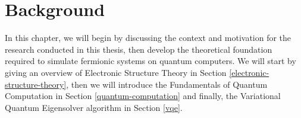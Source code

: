 \chapter{Background}%
\label{background}

In this chapter, we will begin by discussing the context and motivation for the research conducted in this thesis, then develop the theoretical foundation required to simulate fermionic systems on quantum computers. We will start by giving an overview of Electronic Structure Theory in Section \ref{electronic-structure-theory}, then we will introduce the Fundamentals of Quantum Computation in Section \ref{quantum-computation} and finally, the Variational Quantum Eigensolver algorithm in Section \ref{vqe}.
